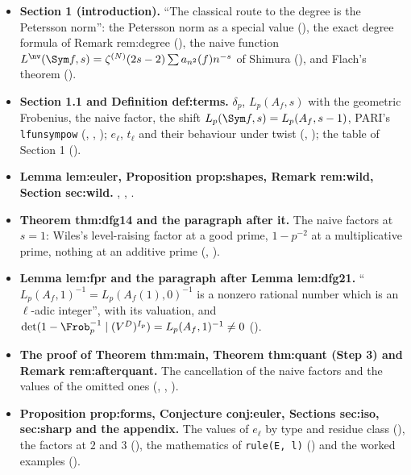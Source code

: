 \begin{itemize}
\item \textbf{Section 1 (introduction).} ``The classical route to the degree is the Petersson norm'': the Petersson norm as a special value
(), the exact degree formula of Remark rem:degree (), the naive function
$L^{\nv}(\Sym f,s)=\zeta^{(N)}(2s-2)\sum a_{n^2}(f)n^{-s}$ of Shimura (), and Flach's theorem ().
\item \textbf{Section 1.1 and Definition def:terms.} $\delta_p$, $L_p(A_f,s)$ with the geometric Frobenius, the naive factor, the shift $L_p(\Sym f,s)=L_p(A_f,s-1)$, PARI's
\texttt{lfunsympow} (, , ); $e_\ell$, $t_\ell$ and
their behaviour under twist (, ); the table of Section 1 ().
\item \textbf{Lemma lem:euler, Proposition prop:shapes, Remark rem:wild, Section sec:wild.} , ,
.
\item \textbf{Theorem thm:dfg14 and the paragraph after it.} The naive factors at $s=1$: Wiles's level-raising factor at a good prime, $1-p^{-2}$ at a multiplicative
prime, nothing at an additive prime (, ).
\item \textbf{Lemma lem:fpr and the paragraph after Lemma lem:dfg21.} ``$L_p(A_f,1)^{-1}=L_p(A_f(1),0)^{-1}$ is a nonzero rational number which is an $\ell$-adic
integer'', with its valuation, and $\det(1-\Frob_p^{-1}\mid(V^D)^{I_p})=L_p(A_f,1)^{-1}\ne0$ ().
\item \textbf{The proof of Theorem thm:main, Theorem thm:quant (Step 3) and Remark rem:afterquant.} The cancellation of the naive factors and the values of the
omitted ones (, , ).
\item \textbf{Proposition prop:forms, Conjecture conj:euler, Sections sec:iso, sec:sharp and the appendix.} The values of $e_\ell$ by type and residue class
(), the factors at $2$ and $3$ (), the mathematics of \texttt{rule(E, l)}
() and the worked examples ().
\end{itemize}

